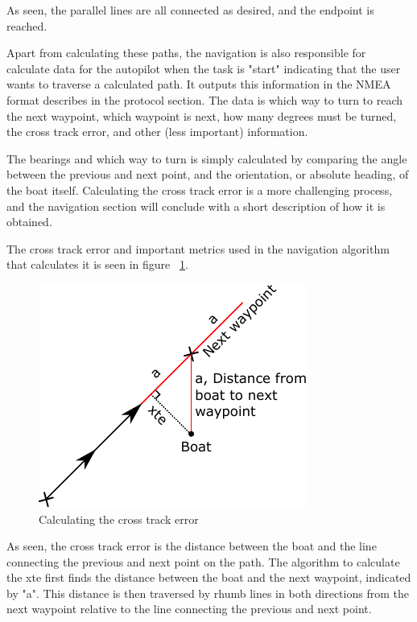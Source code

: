 As seen, the parallel lines are all connected as desired, and the endpoint is reached.

Apart from calculating these paths, the navigation is also responsible for calculate data for the autopilot when the task is "start" indicating that the user wants to traverse a calculated path. It outputs this information in the NMEA format describes in the protocol section. The data is which way to turn to reach the next waypoint, which waypoint is next, how many degrees must be turned, the cross track error, and other (less important) information.

The bearings and which way to turn is simply calculated by comparing the angle between the previous and next point, and the orientation, or absolute heading, of the boat itself. Calculating the cross track error is a more challenging process, and the navigation section will conclude with a short description of how it is obtained. 

The cross track error and important metrics used in the navigation algorithm that calculates it is seen in figure ~\ref{fig:xte}.

\begin{figure}[H]
\centering
\includegraphics[width=0.9\linewidth]{Images/Implementation/xte}
\caption{Calculating the cross track error}
\label{fig:xte}
\end{figure}

As seen, the cross track error is the distance between the boat and the line connecting the previous and next point on the path. The algorithm to calculate the xte first finds the distance between the boat and the next waypoint, indicated by "a". This distance is then traversed by rhumb lines in both directions from the next waypoint relative to the line connecting the previous and next point. 

